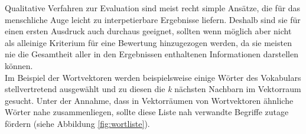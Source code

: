   Qualitative Verfahren zur Evaluation sind meist recht simple Ansätze, die für das menschliche
  Auge leicht zu interpetierbare Ergebnisse liefern. Deshalb sind sie für einen ersten Ausdruck
  auch durchaus geeignet, sollten wenn möglich aber nicht als alleinige Kriterium für eine Bewertung
  hinzugezogen werden, da sie meisten nie die Gesamtheit aller in den Ergebnissen enthaltenen
  Informationen darstellen können. \\
  Im Beispiel der Wortvektoren werden beispielsweise einige Wörter des Vokabulars stellvertretend ausgewählt
  und zu diesen die \emph{k} nächsten Nachbarn im Vektorraum gesucht. Unter der Annahme, dass
  in Vektorräumen von Wortvektoren ähnliche Wörter nahe zusammenliegen, sollte diese Liste nah verwandte
  Begriffe zutage fördern (siehe Abbildung \ref{fig:wortliste}).\\

